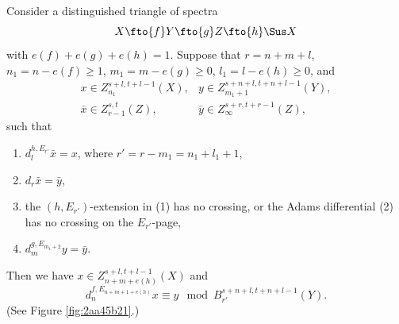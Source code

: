 \documentclass{amsart}
\numberwithin{equation}{section}
\begin{document}
\begin{theorem}\label{thm:158d451a} 
    Consider a distinguished triangle of spectra
    $$X\fto{f} Y\fto{g} Z\fto{h} \Sus X$$
    with $e(f)+e(g)+e(h)=1$.
    Suppose that $r=n+m+l$, $n_1=n-e(f)\ge 1$, $m_1=m-e(g)\ge 0$, $l_1=l-e(h)\ge 0$, and
    $$\begin{array}{ll}
        x\in Z_{n_1}^{s+l,t+l-1}(X), & y\in Z_{m_1+1}^{s+n+l,t+n+l-1}(Y),\\
        \bar x\in Z_{r-1}^{s,t}(Z), & \bar y\in Z_\infty^{s+r,t+r-1}(Z),
    \end{array}$$
    such that
    \begin{enumerate}
        \item $d^{h,E_{r'}}_{l}\bar x=x$, where $r'=r-m_1=n_1+l_1+1$,
        \item $d_r \bar x=\bar y$,
            \item the $(h,E_{r'})$-extension in (1) has no crossing, or the Adams differential (2) has no crossing on the $E_{r'}$-page,
        \item $d^{g,E_{m_1+2}}_{m}y=\bar y$.
    \end{enumerate}
    Then we have $x\in Z_{n+m+e(h)}^{s+l,t+l-1}(X)$ and
    $$d^{f,E_{n+m+1+e(h)}}_{n}x\equiv y \mod B_{r'}^{s+n+l,t+n+l-1}(Y).$$
    (See Figure \ref{fig:2aa45b21}.)
\end{theorem}
\end{document}
